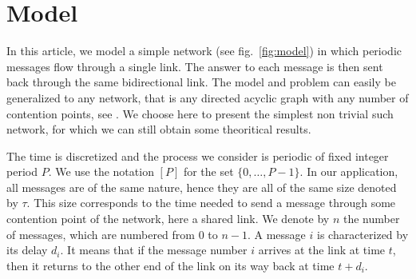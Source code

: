 \documentclass[10pt, conference, letterpaper]{IEEEtran}
\begin{document}
\section{Model}\label{sec:model}


In this article, we model a simple network (see fig.~\ref{fig:model}) in which periodic messages flow through a single link. The answer to each message is then sent back through the same bidirectional link. The model and problem can easily be generalized to any network, that is any directed acyclic graph with any number of contention points, see \cite{dominique2018deterministic}. We choose here to present the simplest non trivial such network, for which we can still obtain some theoritical results. 

The time is discretized and the process we consider is periodic of fixed integer period $P$. We use the notation $[P]$ for the set $\{0,\dots,P-1\}$. In our application, all messages are of the same nature, hence they are all of the same size denoted by $\tau$. This size corresponds to the time needed to send a message through some contention point of the network, here a shared link. We denote by $n$ the number of messages, which are numbered from $0$ to $n-1$. A message $i$ is characterized by its delay $d_i$. It means that if the message number $i$ arrives at the link at time $t$, then it returns to the other end of the link on its way back at time $t + d_i$. 
\end{document}
